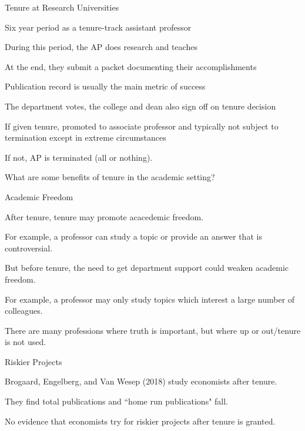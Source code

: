 \documentclass[aspectratio=169,usenames,dvipsnames]{beamer}
\newenvironment{wideitemize}{\itemize\addtolength{\itemsep}{10pt}}{\enditemize}
\begin{document}
\begin{frame}{Tenure at Research Universities}
    \begin{wideitemize}
        \item Six year period as a tenure-track assistant professor
        \item During this period, the AP does research and teaches
        \item At the end, they submit a packet documenting their accomplishments
        \item Publication record is usually the main metric of success
        \item The department votes, the college and dean also sign off on tenure decision
        \item If given tenure, promoted to associate professor and typically not subject to termination except in extreme circumstances
        \item If not, AP is terminated (all or nothing).
    \end{wideitemize}
\end{frame}


\begin{frame}
\centering
    \huge What are some benefits of tenure in the academic setting?
\end{frame}

\begin{frame}{Academic Freedom}
\begin{wideitemize}
    \item After tenure, tenure may promote acacedemic freedom.
    \item For example, a professor can study a topic or provide an answer that is controversial.
    \item But before tenure, the need to get department support could weaken academic freedom.
    \item For example, a professor may only study topics which interest a large number of colleagues.
    \item There are many professions where truth is important, but where up or out/tenure is not used.
\end{wideitemize}
    
\end{frame}

\begin{frame}{Riskier Projects}
\begin{wideitemize}
    \item Brogaard, Engelberg, and Van Wesep (2018) study economists after tenure.
    \item They find total publications and ``home run publications" fall.
    \item No evidence that economists try for riskier projects after tenure is granted.
\end{wideitemize}
    
\end{frame}
\end{document}
